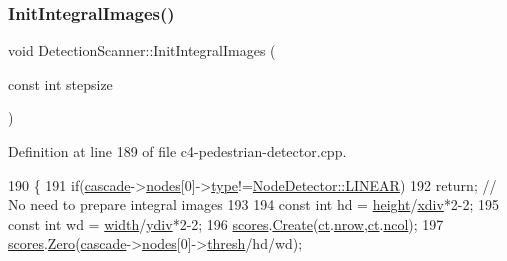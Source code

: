 \subsubsection{\texorpdfstring{Init\+Integral\+Images()}{InitIntegralImages()}}
{\footnotesize\ttfamily void Detection\+Scanner\+::\+Init\+Integral\+Images (\begin{DoxyParamCaption}\item[{const int}]{stepsize }\end{DoxyParamCaption})\hspace{0.3cm}{\ttfamily [private]}}



Definition at line 189 of file c4-\/pedestrian-\/detector.\+cpp.


\begin{DoxyCode}
190 \{
191     \textcolor{keywordflow}{if}(\mbox{\hyperlink{class_detection_scanner_a5fd4ac1b6a6c56a95543eca549c26634}{cascade}}->\mbox{\hyperlink{class_cascade_detector_a7977422f255cf4d753665c0c6a0b0f07}{nodes}}[0]->\mbox{\hyperlink{class_node_detector_a96a5ab514f7996e4e64fff8d37199f64}{type}}!=\mbox{\hyperlink{class_node_detector_a7188c48dfe6b88b3b7f47c599c4832bda92a38601f0cada88be925ffd8824effc}{NodeDetector::LINEAR}})
192         \textcolor{keywordflow}{return}; \textcolor{comment}{// No need to prepare integral images}
193 
194     \textcolor{keyword}{const} \textcolor{keywordtype}{int} hd = \mbox{\hyperlink{class_detection_scanner_a0526f032d5e7efd9fced2592ad5c8d03}{height}}/\mbox{\hyperlink{class_detection_scanner_ab7083b6ed15a71fa96d623a8f6500613}{xdiv}}*2-2;
195     \textcolor{keyword}{const} \textcolor{keywordtype}{int} wd = \mbox{\hyperlink{class_detection_scanner_a37d12c13060640ad0321f089cd565476}{width}}/\mbox{\hyperlink{class_detection_scanner_a78f38bf8d0990ad9ea8cea03ffe4a189}{ydiv}}*2-2;
196     \mbox{\hyperlink{class_detection_scanner_a7358ec22675336179d3cad0809c7b883}{scores}}.\mbox{\hyperlink{class_array2d_c_abfe87be7641dfc586b9e7bffebcca9ec}{Create}}(\mbox{\hyperlink{class_detection_scanner_a885861d4c08a9f9ae4da36f68866419b}{ct}}.\mbox{\hyperlink{class_array2d_c_a12f690f7195f7674a86a7e1eedbc473c}{nrow}},\mbox{\hyperlink{class_detection_scanner_a885861d4c08a9f9ae4da36f68866419b}{ct}}.\mbox{\hyperlink{class_array2d_c_a27e0f8f40f644831cd7c750db59dc28a}{ncol}});
197     \mbox{\hyperlink{class_detection_scanner_a7358ec22675336179d3cad0809c7b883}{scores}}.\mbox{\hyperlink{class_array2d_c_a5e1d7837fd208699694fc3fc97151df0}{Zero}}(\mbox{\hyperlink{class_detection_scanner_a5fd4ac1b6a6c56a95543eca549c26634}{cascade}}->\mbox{\hyperlink{class_cascade_detector_a7977422f255cf4d753665c0c6a0b0f07}{nodes}}[0]->\mbox{\hyperlink{class_node_detector_a2fd8792e80f3f31d2d07831a5169935f}{thresh}}/hd/wd);

\end{DoxyCode}
